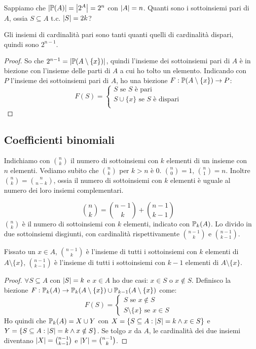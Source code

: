 \begin{prop}
Sappiamo che $\left\lvert{\mathbb{P}(A)}\right\rvert = \left\lvert{2^A}\right\rvert = 2^n$ con $\left\lvert{A}\right\rvert = n$. Quanti sono i sottoinsiemi pari di $A$, ossia $S \subseteq A $ t.c. $\left\lvert{S}\right\rvert = 2k$?

Gli insiemi di cardinalit\`a pari sono tanti quanti quelli di cardinalit\`a dispari, quindi sono $2^{n-1}$.
\end{prop}
\begin{proof}
So che $2^{n-1} = \left\lvert{\mathbb{P}(A \setminus \{x\})}\right\rvert$, quindi l'insieme dei sottoinsiemi pari di $A$ \`e in biezione con l'insieme delle parti di $A$ a cui ho tolto un elemento. Indicando con $P$ l'insieme dei sottoinsiemi pari di $A$, ho una biezione $F : \mathbb{P}(A \setminus \{x\}) \to P$:
\[
F(S) = 
\begin{cases}
S \text{ se } S \text{ \`e pari} \\
S \cup \{ x \} \text{ se } S \text{ \`e dispari} \\
\end{cases}
\]
\end{proof}

\subsection{Coefficienti  binomiali}
Indichiamo con $\binom{n}{k}$ il numero di sottoinsiemi con $k$ elementi di un insieme con $n$ elementi. Vediamo subito che $\binom{n}{k}$ per $k > n$ \`e 0. $\binom{n}{0} = 1$, $\binom{n}{1} = n$. Inoltre $\binom{n}{k} = \binom{n}{n-k}$, ossia il numero di sottoinsiemi con $k$ elementi \`e uguale al numero dei loro insiemi complementari.
\begin{prop}
\begin{equation}
\binom{n}{k} = \binom{n-1}{k} + \binom{n-1}{k-1}
\end{equation}
$\binom{n}{k}$ \`e il numero di sottoinsiemi con $k$ elementi, indicato con $\mathbb{P}_{k}(A)$. Lo divido in due sottoinsiemi disgiunti, con cardinalit\`a rispettivamente $\binom{n-1}{k}$ e $\binom{n-1}{k-1}$.

Fissato un $x \in A$, $\binom{n-1}{k}$ \`e l'insieme di tutti i sottoinsiemi con $k$ elementi di $A \setminus \{ x \}$, $\binom{n-1}{k-1}$ \`e l'insieme di tutti i sottoinsiemi con $k - 1$ elementi di $A \setminus \{x \}$.
\end{prop}
\begin{proof}
$\forall S \subseteq A$ con $\left\lvert{S}\right\rvert = k$ e $x \in A$ ho due casi: $x \in S$ o $x \notin S$. Definisco la biezione $F : \mathbb{P}_k (A) \to \mathbb{P}_k (A \setminus \{ x \}) \cup \mathbb{P}_{k - 1} (A \setminus \{ x \})$ come:
\[
F (S) =
\begin{cases}
S \text{ se } x \notin S \\
S \setminus \{ x \} \text{ se } x \in S
\end{cases}
\]
Ho quindi che $\mathbb{P}_k (A) = X \cup Y$ con $X = \{ S \subseteq A : \left\lvert{S}\right\rvert = k \land x \in S \}$ e $Y = \{ S \subseteq A : \left\lvert{S}\right\rvert = k \land x \notin S\}$. Se tolgo $x$ da $A$, le cardinalit\`a dei due insiemi diventano $\left\lvert{X}\right\rvert = \binom{n - 1}{k - 1}$ e $\left\lvert{Y}\right\rvert = \binom{n - 1}{k}$.
\end{proof}


